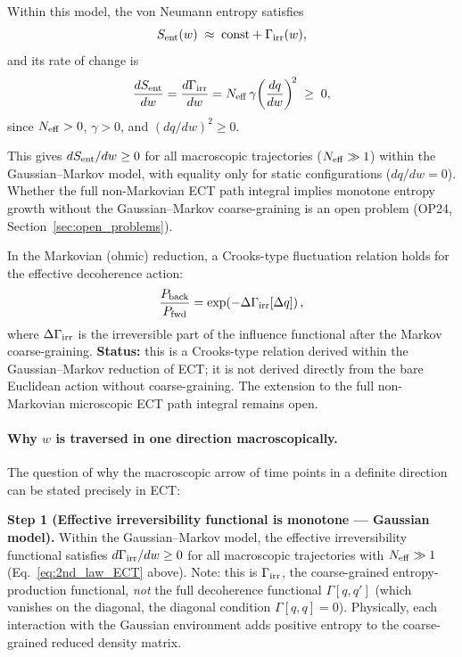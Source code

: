 \documentclass[11pt,a4paper]{article}
\numberwithin{equation}{section}
\begin{document}
Within this model, the von Neumann entropy satisfies
\begin{equation}
\label{eq:S_ent_Gamma}
S_{\rm ent}(w) \;\approx\; \mathrm{const} + \Gamma_{\rm irr}(w),
\end{equation}
and its rate of change is
\begin{equation}
\label{eq:2nd_law_ECT}
\frac{dS_{\rm ent}}{dw}
= \frac{d\Gamma_{\rm irr}}{dw}
= N_{\rm eff}\,\gamma\!\left(\frac{dq}{dw}\right)^{\!2}
\;\geq\; 0,
\end{equation}
since $N_{\rm eff}>0$, $\gamma>0$, and $(dq/dw)^2\geq0$.

This gives $dS_{\rm ent}/dw\geq0$ for all macroscopic trajectories
($N_{\rm eff}\gg1$) within the Gaussian--Markov model, with equality
only for static configurations ($dq/dw=0$).
Whether the full non-Markovian ECT path integral implies monotone
entropy growth without the Gaussian--Markov coarse-graining is an
open problem (OP24, Section~\ref{sec:open_problems}).

In the Markovian (ohmic) reduction, a Crooks-type fluctuation
relation holds for the effective decoherence action:
\begin{equation}
  \label{eq:crooks_ECT}
  \frac{P_{\rm back}}{P_{\rm fwd}}
  = \exp\!\left(-\Delta\Gamma_{\rm irr}[\Delta q]\right),
\end{equation}
where $\Delta\Gamma_{\rm irr}$ is the irreversible part of the
influence functional after the Markov coarse-graining.
\textbf{Status:} this is a Crooks-type relation derived within the
Gaussian--Markov reduction of ECT; it is not derived directly from
the bare Euclidean action without coarse-graining.  The extension
to the full non-Markovian microscopic ECT path integral remains open.

\paragraph{Why $w$ is traversed in one direction macroscopically.}
\label{par:arrow_of_time}

The question of why the macroscopic arrow of time points in a definite
direction can be stated precisely in ECT:

\textbf{Step 1 (Effective irreversibility functional is monotone --- Gaussian model).}
Within the Gaussian--Markov model, the effective irreversibility
functional satisfies $d\Gamma_{\rm irr}/dw\geq0$
for all macroscopic trajectories with $N_{\rm eff}\gg1$
(Eq.~\eqref{eq:2nd_law_ECT} above).
Note: this is $\Gamma_{\rm irr}$, the coarse-grained entropy-production
functional, \emph{not} the full decoherence functional
$\Gamma[q,q']$ (which vanishes on the diagonal,
the diagonal condition $\Gamma[q,q]=0$).
Physically, each interaction with the Gaussian environment adds positive
entropy to the coarse-grained reduced density matrix.
\end{document}
